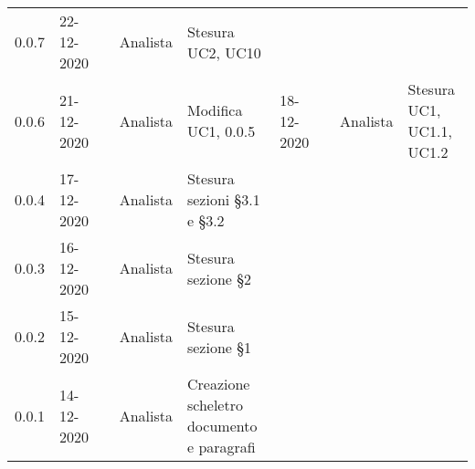 {{\begin{longtable}{C{1.7cm} C{2.5cm} C{3.2cm} C{2.7cm} C{4.8cm}}
0.0.7 & 22-12-2020 & \SG{} & Analista & Stesura UC2, UC10\\
0.0.6 & 21-12-2020 & \BM{} & Analista & Modifica UC1,%
0.0.5 & 18-12-2020 & \SP{} & Analista & Stesura UC1, UC1.1, UC1.2\\
0.0.4 & 17-12-2020 & \SP{} & Analista & Stesura sezioni §3.1 e §3.2\\	
0.0.3 & 16-12-2020 & \SP{} & Analista & Stesura sezione §2\\
0.0.2 & 15-12-2020 & \SP{} & Analista & Stesura sezione §1\\
0.0.1 & 14-12-2020 & \SP{} & Analista & Creazione scheletro documento e paragrafi\\
		
\end{longtable}
}
}
